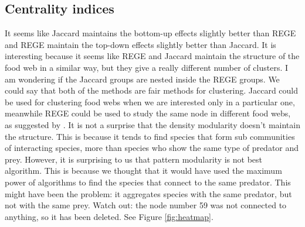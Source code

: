 \documentclass[twocolumn]{article}
\begin{document}
    \subsection{Centrality indices}
        It seems like Jaccard maintains the bottom-up effects slightly better than REGE and REGE maintain the top-down effects slightly better than Jaccard. It is interesting because it seems like REGE and Jaccard maintain the structure of the food web in a similar way, but they give a really different number of clusters. I am wondering if the Jaccard groups are nested inside the REGE groups. We could say that both of the methods are fair methods for clustering. Jaccard could be used for clustering food webs when we are interested only in a particular one, meanwhile REGE could be used to study the same node in different food webs, as suggested by \citet{Luczkovich2003}. It is not a surprise that the density modularity doesn't maintain the structure. This is because it tends to find species that form sub communities of interacting species, more than species who show the same type of predator and prey. However, it is surprising to us that pattern modularity is not best algorithm. This is because we thought that it would have used the maximum power of algorithms to find the species that connect to the same predator. This might have been the problem: it aggregates species with the same predator, but not with the same prey.
        Watch out: the node number 59 was not connected to anything, so it has been deleted. See Figure \ref{fig:heatmap}.
\end{document}
